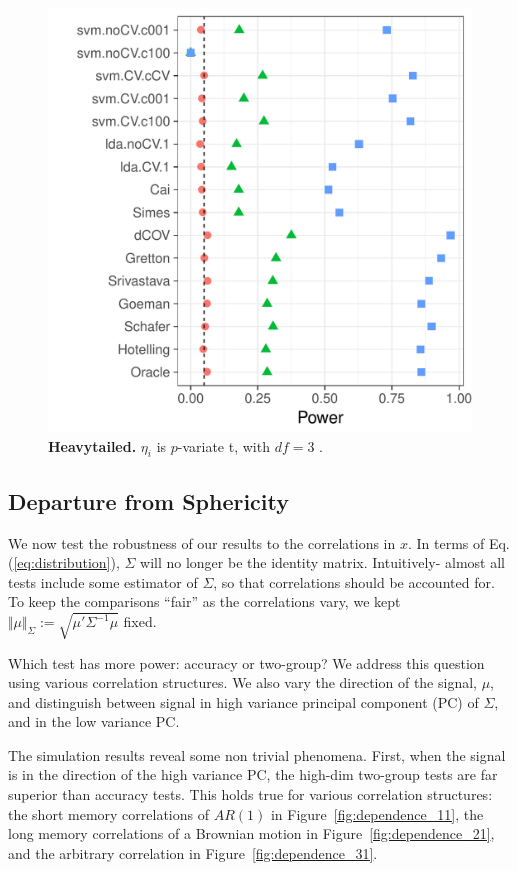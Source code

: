 \documentclass[onecolumn,draftclsnofoot]{IEEEtran}
\begin{document}
\begin{figure}[th]
	\centering
	\includegraphics[width=0.7\columnwidth]{"art/file9"}
	\caption{\textbf{Heavytailed.} $\eta_i$ is $p$-variate t, with $df=3$ .  } 
	\label{fig:t_null}
\end{figure}




\subsection{Departure from Sphericity}
\label{sec:dependence}

We now test the robustness of our results to the correlations in $x$. 
In terms of Eq.(\ref{eq:distribution}), $\Sigma$ will no longer be the identity matrix. 
Intuitively- almost all tests include some estimator of $\Sigma$, so that correlations should be accounted for.
To keep the comparisons ``fair'' as the correlations vary, we kept $\Vert \mu \Vert_\Sigma:=\sqrt{\mu'\Sigma^{-1}\mu}$ fixed. 

Which test has more power: accuracy or two-group?
We address this question using various correlation structures.
We also vary the direction of the signal, $\mu$, and distinguish between signal in high variance principal component (PC) of $\Sigma$, and in the low variance PC. 

The simulation results reveal some non trivial phenomena.
First, when the signal is in the direction of the high variance PC, the high-dim two-group tests are far superior than accuracy tests. 
This holds true for various correlation structures: the short memory correlations of $AR(1)$ in Figure~\ref{fig:dependence_11}, the long memory correlations of a Brownian motion in Figure~\ref{fig:dependence_21}, and the arbitrary correlation in Figure~\ref{fig:dependence_31}.
\end{document}
